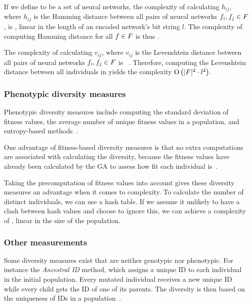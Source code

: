If we define \indset{} to be a set of neural networks, the complexity of calculating $h_{ij}$, where $h_{ij}$ is the Hamming distance between all pairs of neural networks $f_i, f_j \in F$, is \bigO{\bitstringl}, linear in the length of an encoded network's bit string $l$. The complexity of computing Hamming distance for all $f \in F$ is thus \bigO{\indsetl^2 \cdot \bitstringl}. 

The complexity of calculating $v_{ij}$, where $v_{ij}$ is the Levenshtein distance between all pairs of neural networks $f_i, f_j \in F$ is ~\cite{Freeman:2006:CLN:1220835.1220895}. Therefore, computing the Levenshtein distance between all individuals in \indset{} yields the complexity $\operatorname{O}\left(\lvert F\rvert^2 \cdot l^2\right)$.

\subsubsection{Phenotypic diversity measures}
Phenotypic diversity measures include computing the standard deviation of fitness values, the average number of unique fitness values in a population, and entropy-based methods~\cite{1250187, 1266373}.

One advantage of fitness-based diversity measures is that no extra computations are associated with calculating the diversity, because the fitness values have already been calculated by the GA to assess how fit each individual is~\cite{Nguyen:2006:ASPGP}.

Taking the precomputation of fitness values into account gives these diversity measures an advantage when it comes to complexity. To calculate the number of distinct individuals, we can use a hash table. If we assume it unlikely to have a clash between hash values and choose to ignore this, we can achieve a complexity of \bigO{\indsetl}, linear in the size of the population.

\subsubsection{Other measurements}
Some diversity measures exist that are neither genotypic nor phenotypic. For instance the \emph{Ancestral ID} method, which assigns a unique ID to each individual in the initial population. Every mutated individual receives a new unique ID while every child gets the ID of one of its parents. The diversity is then based on the uniqueness of IDs in a population~\cite{1250187}.
